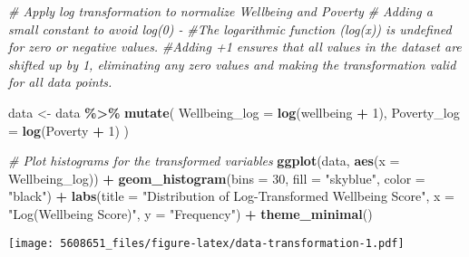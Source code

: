 \documentclass[
]{article}
\newenvironment{Shaded}{\begin{snugshade}}{\end{snugshade}}
\newcommand{\AttributeTok}[1]{\textcolor[rgb]{0.13,0.29,0.53}{#1}}
\newcommand{\CommentTok}[1]{\textcolor[rgb]{0.56,0.35,0.01}{\textit{#1}}}
\newcommand{\DecValTok}[1]{\textcolor[rgb]{0.00,0.00,0.81}{#1}}
\newcommand{\FunctionTok}[1]{\textcolor[rgb]{0.13,0.29,0.53}{\textbf{#1}}}
\newcommand{\NormalTok}[1]{#1}
\newcommand{\OtherTok}[1]{\textcolor[rgb]{0.56,0.35,0.01}{#1}}
\newcommand{\SpecialCharTok}[1]{\textcolor[rgb]{0.81,0.36,0.00}{\textbf{#1}}}
\newcommand{\StringTok}[1]{\textcolor[rgb]{0.31,0.60,0.02}{#1}}
\begin{document}
\begin{Shaded}
\begin{Highlighting}[]
\CommentTok{\# Apply log transformation to normalize Wellbeing and Poverty}
\CommentTok{\# Adding a small constant to avoid log(0) {-} }
\CommentTok{\#The logarithmic function (log(x)) is undefined for zero or negative values.}
\CommentTok{\#Adding +1 ensures that all values in the dataset are shifted up by 1, eliminating any zero values and making the transformation valid for all data points.}

\NormalTok{data }\OtherTok{\textless{}{-}}\NormalTok{ data }\SpecialCharTok{\%\textgreater{}\%}
  \FunctionTok{mutate}\NormalTok{(}
    \AttributeTok{Wellbeing\_log =} \FunctionTok{log}\NormalTok{(wellbeing }\SpecialCharTok{+} \DecValTok{1}\NormalTok{),}
    \AttributeTok{Poverty\_log =} \FunctionTok{log}\NormalTok{(Poverty }\SpecialCharTok{+} \DecValTok{1}\NormalTok{)}
\NormalTok{  )}

\CommentTok{\# Plot histograms for the transformed variables}
\FunctionTok{ggplot}\NormalTok{(data, }\FunctionTok{aes}\NormalTok{(}\AttributeTok{x =}\NormalTok{ Wellbeing\_log)) }\SpecialCharTok{+}
  \FunctionTok{geom\_histogram}\NormalTok{(}\AttributeTok{bins =} \DecValTok{30}\NormalTok{, }\AttributeTok{fill =} \StringTok{"skyblue"}\NormalTok{, }\AttributeTok{color =} \StringTok{"black"}\NormalTok{) }\SpecialCharTok{+}
  \FunctionTok{labs}\NormalTok{(}\AttributeTok{title =} \StringTok{"Distribution of Log{-}Transformed Wellbeing Score"}\NormalTok{, }\AttributeTok{x =} \StringTok{"Log(Wellbeing Score)"}\NormalTok{, }\AttributeTok{y =} \StringTok{"Frequency"}\NormalTok{) }\SpecialCharTok{+}
  \FunctionTok{theme\_minimal}\NormalTok{()}
\end{Highlighting}
\end{Shaded}

\texttt{[image: 5608651\_files/figure-latex/data-transformation-1.pdf]}
\end{document}
